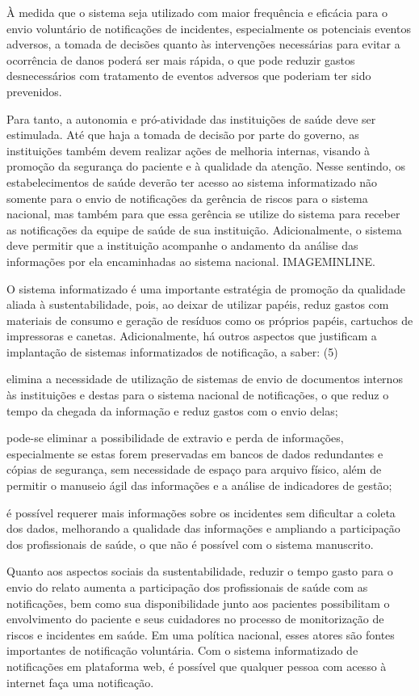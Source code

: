 \documentclass{article}
\begin{document}
À medida que o sistema seja utilizado com maior frequência e eficácia para o
envio
voluntário de notificações de incidentes, especialmente os potenciais eventos
adversos, a
tomada de decisões quanto às intervenções necessárias para evitar a ocorrência
de danos
poderá ser mais rápida, o que pode reduzir gastos desnecessários com tratamento
de eventos
adversos que poderiam ter sido prevenidos.

Para tanto, a autonomia e pró-atividade das instituições de saúde deve ser
estimulada. Até
que haja a tomada de decisão por parte do governo, as instituições também devem
realizar
ações de melhoria internas, visando à promoção da segurança do paciente e à
qualidade da
atenção. Nesse sentindo, os estabelecimentos de saúde deverão ter acesso ao
sistema
informatizado não somente para o envio de notificações da gerência de riscos
para o sistema
nacional, mas também para que essa gerência se utilize do sistema para receber
as
notificações da equipe de saúde de sua instituição. Adicionalmente, o sistema
deve permitir
que a instituição acompanhe o andamento da análise das informações por ela
encaminhadas ao
sistema nacional. IMAGEMINLINE.

O sistema informatizado é uma importante estratégia de promoção da qualidade
aliada à
sustentabilidade, pois, ao deixar de utilizar papéis, reduz gastos com materiais
de consumo
e geração de resíduos como os próprios papéis, cartuchos de impressoras e
canetas.
Adicionalmente, há outros aspectos que justificam a implantação de sistemas
informatizados
de notificação, a saber: (5)

elimina a necessidade de utilização de sistemas de envio de documentos internos
às
instituições e destas para o sistema nacional de notificações, o que reduz o
tempo da
chegada da informação e reduz gastos com o envio delas;

pode-se eliminar a possibilidade de extravio e perda de informações,
especialmente se
estas forem preservadas em bancos de dados redundantes e cópias de segurança,
sem
necessidade de espaço para arquivo físico, além de permitir o manuseio ágil das
informações e a análise de indicadores de gestão;

é possível requerer mais informações sobre os incidentes sem dificultar a coleta
dos
dados, melhorando a qualidade das informações e ampliando a participação dos
profissionais de saúde, o que não é possível com o sistema manuscrito.

Quanto aos aspectos sociais da sustentabilidade, reduzir o tempo gasto para o
envio do
relato aumenta a participação dos profissionais de saúde com as notificações,
bem como sua
disponibilidade junto aos pacientes possibilitam o envolvimento do paciente e
seus
cuidadores no processo de monitorização de riscos e incidentes em saúde. Em uma
política
nacional, esses atores são fontes importantes de notificação voluntária. Com o
sistema
informatizado de notificações em plataforma web, é possível que qualquer pessoa
com acesso à
internet faça uma notificação.
\end{document}
